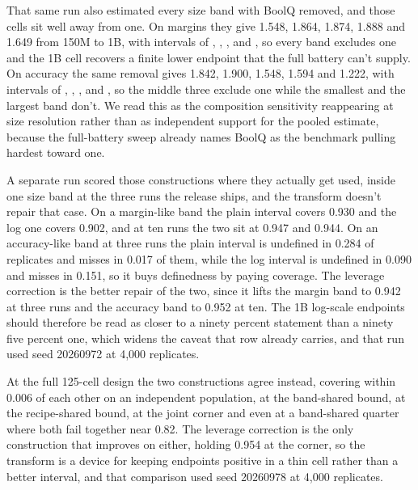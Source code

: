 That same run also estimated every size band with BoolQ removed, and those cells sit well away from one. On margins they give 1.548, 1.864, 1.874, 1.888 and 1.649 from 150M to 1B, with intervals of , , ,  and , so every band excludes one and the 1B cell recovers a finite lower endpoint that the full battery can't supply. On accuracy the same removal gives 1.842, 1.900, 1.548, 1.594 and 1.222, with intervals of , , ,  and , so the middle three exclude one while the smallest and the largest band don't. We read this as the composition sensitivity reappearing at size resolution rather than as independent support for the pooled estimate, because the full-battery sweep already names BoolQ as the benchmark pulling hardest toward one.

A separate run scored those constructions where they actually get used, inside one size band at the three runs the release ships, and the transform doesn't repair that case. On a margin-like band the plain interval covers 0.930 and the log one covers 0.902, and at ten runs the two sit at 0.947 and 0.944. On an accuracy-like band at three runs the plain interval is undefined in 0.284 of replicates and misses in 0.017 of them, while the log interval is undefined in 0.090 and misses in 0.151, so it buys definedness by paying coverage. The leverage correction is the better repair of the two, since it lifts the margin band to 0.942 at three runs and the accuracy band to 0.952 at ten. The 1B log-scale endpoints should therefore be read as closer to a ninety percent statement than a ninety five percent one, which widens the caveat that row already carries, and that run used seed 20260972 at 4,000 replicates.

At the full 125-cell design the two constructions agree instead, covering within 0.006 of each other on an independent population, at the band-shared bound, at the recipe-shared bound, at the joint corner and even at a band-shared quarter where both fail together near 0.82. The leverage correction is the only construction that improves on either, holding 0.954 at the corner, so the transform is a device for keeping endpoints positive in a thin cell rather than a better interval, and that comparison used seed 20260978 at 4,000 replicates.

